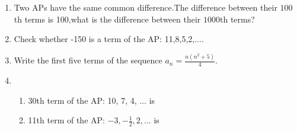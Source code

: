 \begin{enumerate}[label=\thesection.\arabic*,ref=\thesection.\theenumi]
\item Two APs have the same common difference.The difference between their $100${th} terms is 100,what is the difference between their $1000${th} terms?

\solution


\item Check whether -150 is a term of the AP: 11,8,5,2,....

 \solution
 
 \pagebreak

 \item Write the first five terms of the sequence \(a_n = \frac{n(n^2+5)}{4}\).

\solution

\pagebreak

\item
\begin{enumerate}
\item 30th term of the AP: 10, 7, 4, $\ldots$ is 
\item 11th term of the AP: $-3, -\frac{1}{2}, 2, \ldots$ is
\end{enumerate}
\solution


\end{enumerate}
